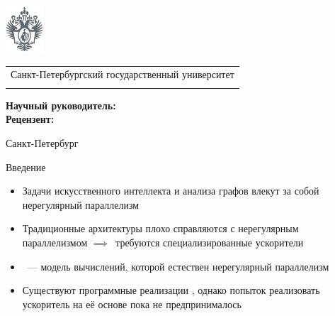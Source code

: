 \documentclass
  [ russian
  , aspectratio=169 %
  ] {beamer}
\title[Lamagraph: Транслятор в Interaction Nets]{\my@title@title@ru}
\author[\my@title@author@ru]{\my@title@author@ru, группа \academicGroup}
\institute[СПбГУ]{}
\date[25 апреля 2025 г.]{}
\makeatletter
\newcommand{\advisorChair}{\my@title@chair@ru}
\newcommand{\supervisor}{\my@title@supervisor@ru}
\newcommand{\supervisorPosition}{\my@title@supervisorPosition@ru}
\newcommand{\consultant}{\my@title@consultant@ru}
\newcommand{\consultantPosition}{\my@title@consultantPosition@ru}
\newcommand{\reviewer}{\my@title@reviewer@ru}
\newcommand{\reviewerPosition}{\my@title@reviewerPosition@ru}
\newcommand{\defenseYear}{\my@title@year@ru}
\makeatother
\begin{document}
{
\begin{frame}
    \includegraphics[width=1.4cm]{figures/герб_серый.png}
    \vspace{-35pt}
    \hspace{-10pt}
    \begin{center}
        \begin{tabular}{c}
            \scriptsize{Санкт-Петербургский государственный университет} \\
            \scriptsize{\advisorChair}
        \end{tabular}
        \titlepage
    \end{center}

    \btVFill

    {\scriptsize
        \textbf{Научный руководитель:} \supervisorPosition~\supervisor \\
        \textbf{Рецензент:} \reviewerPosition~\reviewer \\
    }
    \makeatother
    \begin{center}
        \vspace{5pt}
        \scriptsize{Санкт-Петербург\\ \defenseYear}
    \end{center}
\end{frame}
}

\begin{frame}{Введение}

    \begin{itemize}
        \item Задачи искусственного интеллекта и анализа графов влекут за собой нерегулярный параллелизм
        \item Традиционные архитектуры плохо справляются с нерегулярным параллелизмом $\implies$~требуются специализированные ускорители
        \item \INs{}~--- модель вычислений, которой естествен нерегулярный параллелизм
        \item Существуют программные реализации \INs{}, однако попыток реализовать ускоритель на её основе пока не предпринималось
    \end{itemize}

\end{frame}
\end{document}
